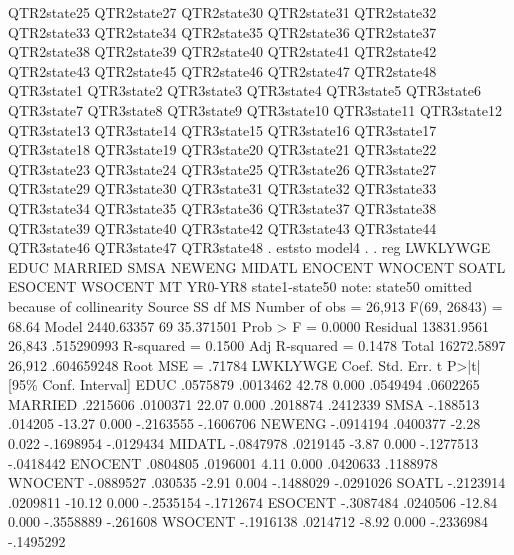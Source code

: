                QTR2state25 QTR2state27 QTR2state30 QTR2state31 QTR2state32
               QTR2state33 QTR2state34 QTR2state35 QTR2state36 QTR2state37
               QTR2state38 QTR2state39 QTR2state40 QTR2state41 QTR2state42
               QTR2state43 QTR2state45 QTR2state46 QTR2state47 QTR2state48
               QTR3state1 QTR3state2 QTR3state3 QTR3state4 QTR3state5
               QTR3state6 QTR3state7 QTR3state8 QTR3state9 QTR3state10
               QTR3state11 QTR3state12 QTR3state13 QTR3state14 QTR3state15
               QTR3state16 QTR3state17 QTR3state18 QTR3state19 QTR3state20
               QTR3state21 QTR3state22 QTR3state23 QTR3state24 QTR3state25
               QTR3state26 QTR3state27 QTR3state29 QTR3state30 QTR3state31
               QTR3state32 QTR3state33 QTR3state34 QTR3state35 QTR3state36
               QTR3state37 QTR3state38 QTR3state39 QTR3state40 QTR3state42
               QTR3state43 QTR3state44 QTR3state46 QTR3state47 QTR3state48
{\smallskip}
. eststo model4
{\smallskip}
. 
. reg  LWKLYWGE EDUC MARRIED SMSA NEWENG MIDATL ENOCENT WNOCENT SOATL ESOCENT WSOCENT MT YR0-YR8  state1-state50
note: state50 omitted because of collinearity
{\smallskip}
      Source {\VBAR}       SS           df       MS      Number of obs   =    26,913
   F(69, 26843)    =     68.64
       Model {\VBAR}  2440.63357        69   35.371501   Prob > F        =    0.0000
    Residual {\VBAR}  13831.9561    26,843  .515290993   R-squared       =    0.1500
   Adj R-squared   =    0.1478
       Total {\VBAR}  16272.5897    26,912  .604659248   Root MSE        =    .71784
{\smallskip}
    LWKLYWGE {\VBAR}      Coef.   Std. Err.      t    P>|t|     [95\% Conf. Interval]
        EDUC {\VBAR}   .0575879   .0013462    42.78   0.000     .0549494    .0602265
     MARRIED {\VBAR}   .2215606   .0100371    22.07   0.000     .2018874    .2412339
        SMSA {\VBAR}   -.188513    .014205   -13.27   0.000    -.2163555   -.1606706
      NEWENG {\VBAR}  -.0914194   .0400377    -2.28   0.022    -.1698954   -.0129434
      MIDATL {\VBAR}  -.0847978   .0219145    -3.87   0.000    -.1277513   -.0418442
     ENOCENT {\VBAR}   .0804805   .0196001     4.11   0.000     .0420633    .1188978
     WNOCENT {\VBAR}  -.0889527    .030535    -2.91   0.004    -.1488029   -.0291026
       SOATL {\VBAR}  -.2123914   .0209811   -10.12   0.000    -.2535154   -.1712674
     ESOCENT {\VBAR}  -.3087484   .0240506   -12.84   0.000    -.3558889    -.261608
     WSOCENT {\VBAR}  -.1916138   .0214712    -8.92   0.000    -.2336984   -.1495292
